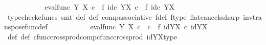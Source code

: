 \begin{isabellebody}
\ \ \ \ \ \ \isamarkupfalse%
\ \isamarkupfalse%
\ {\isachardoublequoteopen}{\isachardot}{\kern0pt}{\isachardot}{\kern0pt}{\isachardot}{\kern0pt}\ {\isacharequal}{\kern0pt}\ eval{\isacharunderscore}{\kern0pt}func\ Y\ X\ {\isasymcirc}\isactrlsub c\ {\isacharparenleft}{\kern0pt}{\isasympsi}\ {\isasymtimes}\isactrlsub f\ id\isactrlsub c\ {\isacharparenleft}{\kern0pt}Y\isactrlbsup X\isactrlesup {\isacharparenright}{\kern0pt}{\isacharparenright}{\kern0pt}\ {\isasymcirc}\isactrlsub c\ {\isacharparenleft}{\kern0pt}{\isasymphi}\ {\isasymtimes}\isactrlsub f\ id\isactrlsub c\ {\isacharparenleft}{\kern0pt}Y\isactrlbsup X\isactrlesup {\isacharparenright}{\kern0pt}{\isacharparenright}{\kern0pt}{\isachardoublequoteclose}\isanewline
\ \ \ \ \ \ \ \ \isamarkupfalse%
\ {\isacharparenleft}{\kern0pt}typecheck{\isacharunderscore}{\kern0pt}cfuncs{\isacharcomma}{\kern0pt}\ smt\ {\isasymphi}{\isacharunderscore}{\kern0pt}def\ {\isasympsi}{\isacharunderscore}{\kern0pt}def\ comp{\isacharunderscore}{\kern0pt}associative{}\ f{\isacharunderscore}{\kern0pt}def\ f{\isacharunderscore}{\kern0pt}type\ flat{\isacharunderscore}{\kern0pt}cancels{\isacharunderscore}{\kern0pt}sharp\ inv{\isacharunderscore}{\kern0pt}transpose{\isacharunderscore}{\kern0pt}func{\isacharunderscore}{\kern0pt}def{}{\isacharparenright}{\kern0pt}\isanewline
\ \ \ \ \ \ \isamarkupfalse%
\ \isamarkupfalse%
\ {\isachardoublequoteopen}{\isachardot}{\kern0pt}{\isachardot}{\kern0pt}{\isachardot}{\kern0pt}\ {\isacharequal}{\kern0pt}\ eval{\isacharunderscore}{\kern0pt}func\ Y\ X\ {\isasymcirc}\isactrlsub c\ {\isacharparenleft}{\kern0pt}{\isacharparenleft}{\kern0pt}{\isasympsi}\ {\isasymcirc}\isactrlsub c\ {\isasymphi}{\isacharparenright}{\kern0pt}\ {\isasymtimes}\isactrlsub f\ {\isacharparenleft}{\kern0pt}id{\isacharparenleft}{\kern0pt}Y\isactrlbsup X\isactrlesup {\isacharparenright}{\kern0pt}\ {\isasymcirc}\isactrlsub c\ id{\isacharparenleft}{\kern0pt}Y\isactrlbsup X\isactrlesup {\isacharparenright}{\kern0pt}{\isacharparenright}{\kern0pt}{\isacharparenright}{\kern0pt}{\isachardoublequoteclose}\isanewline
\ \ \ \ \ \ \ \ \isamarkupfalse%
\ {\isasymphi}{\isacharunderscore}{\kern0pt}def\ {\isasympsi}{\isacharunderscore}{\kern0pt}def\ cfunc{\isacharunderscore}{\kern0pt}cross{\isacharunderscore}{\kern0pt}prod{\isacharunderscore}{\kern0pt}comp{\isacharunderscore}{\kern0pt}cfunc{\isacharunderscore}{\kern0pt}cross{\isacharunderscore}{\kern0pt}prod\ idYX{\isacharunderscore}{\kern0pt}type\ \isamarkupfalse%

\end{isabellebody}

